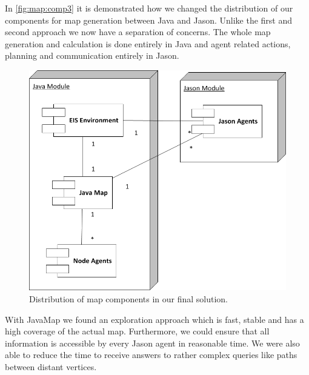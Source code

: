 In \autoref{fig:map:comp3} it is demonstrated how we changed the distribution of our components for map generation between Java and Jason.
Unlike the first and second approach we now have a separation of concerns.
The whole map generation and calculation is done entirely in Java and agent related actions, planning and communication entirely in Jason.
\begin{figure}
  \centering
  \includegraphics[width=0.6\linewidth]{images/map_comp_3.png}
  \caption{Distribution of map components in our final solution.}
  \label{fig:map:comp3}
\end{figure}

With JavaMap we found an exploration approach which is fast, stable and has a high coverage of the actual map.
Furthermore, we could ensure that all information is accessible by every Jason agent in reasonable time.
We were also able to reduce the time to receive answers to rather complex queries like paths between distant vertices.
